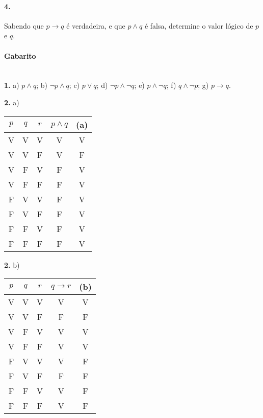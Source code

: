 \documentclass[a4paper,twocolumn,12pt]{article}
\begin{document}
\paragraph*{4.} Sabendo que $p\to q$ é verdadeira, e que $p\land q$ é falsa, determine o valor lógico de $p$ e $q$.

\vspace*{\fill}

{\footnotesize \color{darkgray}
\paragraph*{Gabarito} \hspace*{\fill}\\
\textbf{1.} a) $p\land q$; b) $\neg p\land q$; c) $p\lor q$; d) $\neg p\land \neg q$; e) $p\land \neg q$; f) $q \land \neg p$; g) $p\to q$.\\

\begin{minipage}{0.49\columnwidth}
  \textbf{2.} a)
  
  \begin{tabular}{|c|c|c|c|c|}
    \hline
    $p$ & $q$ & $r$ & $p \land q$ & (a) \\
    \hline
    V & V & V & V & V \\
    V & V & F & V & F \\
    V & F & V & F & V \\
    V & F & F & F & V \\
    F & V & V & F & V \\
    F & V & F & F & V \\
    F & F & V & F & V \\
    F & F & F & F & V \\
    \hline
    \end{tabular}
\end{minipage}\begin{minipage}{0.49\columnwidth}
  \textbf{2.} b)

 \begin{tabular}{|c|c|c|c|c|}
    \hline
    $p$ & $q$ & $r$ & $q \to r$ & (b) \\
    \hline
    V & V & V & V & V \\
    V & V & F & F & F \\
    V & F & V & V & V \\
    V & F & F & V & V \\
    F & V & V & V & F \\
    F & V & F & F & F \\
    F & F & V & V & F \\
    F & F & F & V & F \\
    \hline
    \end{tabular}
  \end{minipage}

}
\end{document}
